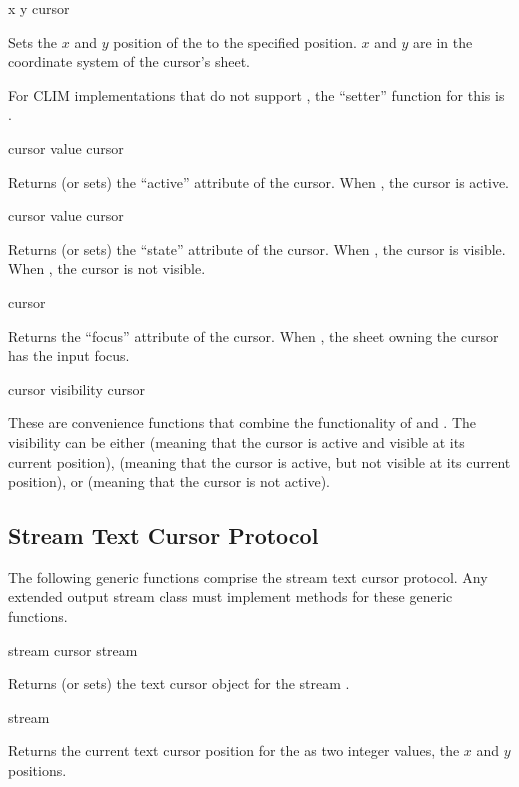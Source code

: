  {x y cursor}

Sets the $x$ and $y$ position of the   to the specified
position.  $x$ and $y$ are in the coordinate system of the cursor's sheet.

For CLIM implementations that do not support , the ``setter'' function
for this is .

 {cursor}
 {value cursor}

Returns (or sets) the ``active'' attribute of the cursor.  When , the
cursor is active.

 {cursor}
 {value cursor}

Returns (or sets) the ``state'' attribute of the cursor.  When , the
cursor is visible.  When , the cursor is not visible.

 {cursor}

Returns the ``focus'' attribute of the cursor.  When , the sheet
owning the cursor has the input focus.

 {cursor}
 {visibility cursor}

These are convenience functions that combine the functionality of
 and .  The visibility can be either 
(meaning that the cursor is active and visible at its current position),
 (meaning that the cursor is active, but not visible at its current
position), or  (meaning that the cursor is not active).


\subsection {Stream Text Cursor Protocol}

The following generic functions comprise the stream text cursor protocol.  Any
extended output stream class must implement methods for these generic functions.

 {stream}
 {cursor stream}

Returns (or sets) the text cursor object for the stream .


 {stream}

Returns the current text cursor position for the 
 as two integer values, the $x$ and $y$ positions.

